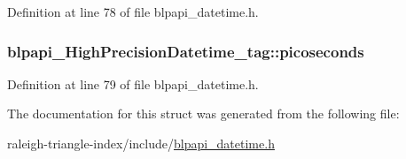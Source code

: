 Definition at line 78 of file blpapi\+\_\+datetime.\+h.

\subsubsection[{\texorpdfstring{picoseconds}{picoseconds}}]{ blpapi\+\_\+\+High\+Precision\+Datetime\+\_\+tag\+::picoseconds}\hypertarget{structblpapi___high_precision_datetime__tag_a06e6cef288d60fd91fff08f6fadc3c75}{}\label{structblpapi___high_precision_datetime__tag_a06e6cef288d60fd91fff08f6fadc3c75}


Definition at line 79 of file blpapi\+\_\+datetime.\+h.



The documentation for this struct was generated from the following file\+:\begin{DoxyCompactItemize}
\item 
raleigh-\/triangle-\/index/include/\hyperlink{blpapi__datetime_8h}{blpapi\+\_\+datetime.\+h}\end{DoxyCompactItemize}
